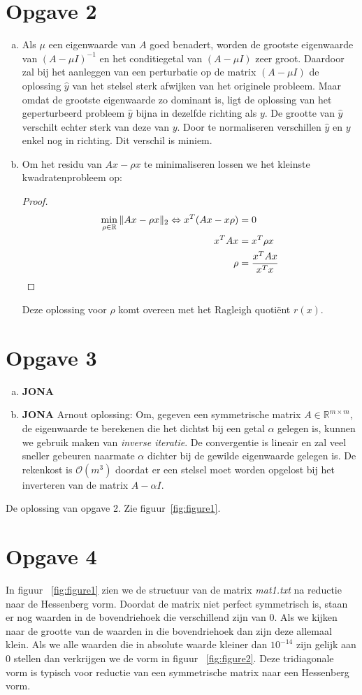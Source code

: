 \documentclass[a4paper]{article}
\newcommand{\opgave}[1]{\section*{Opgave #1}}
\begin{document}
\opgave{2}
\begin{enumerate}[a)] %
\item Als $\mu$ een eigenwaarde van $A$ goed benadert, worden de grootste eigenwaarde van $(A-\mu I)^{-1}$ en het conditiegetal van $(A-\mu I)$ zeer groot. Daardoor zal bij het aanleggen van een perturbatie op de matrix $(A-\mu I)$ de oplossing $\hat{y}$ van het stelsel sterk afwijken van het originele probleem. Maar omdat de grootste eigenwaarde zo dominant is, ligt de oplossing van het geperturbeerd probleem $\hat{y}$ bijna in dezelfde richting als $y$. De grootte van $\hat{y}$ verschilt echter sterk van deze van $y$. Door te normaliseren verschillen $\hat{y}$ en $y$ enkel nog in richting. Dit verschil is miniem.
\item Om het residu van $Ax-\rho x$ te minimaliseren lossen we het kleinste kwadratenprobleem op:
\begin{proof}
\begin{align}
\displaystyle\min_{\rho\in\mathbb{R}}\Arrowvert Ax-\rho x \Arrowvert _2 \Leftrightarrow x^{T}(Ax-x\rho) &= 0\label{eq1}\\
 x^TAx &= x^T\rho x \label{eq2}\\
 \rho&=\frac{x^TAx}{x^Tx} \label{eq:const1}
\end{align}
\end{proof}
Deze oplossing voor $\rho$ komt overeen met het Ragleigh quoti\"{e}nt $r(x)$.
\end{enumerate}



\opgave{3}
\begin{enumerate}[a)] %
\item \textbf{JONA}
\item \textbf{JONA} Arnout oplossing: Om, gegeven een symmetrische matrix $A \in \mathbb{R}^{m\times m}$, de eigenwaarde te berekenen die het dichtst bij een getal $\alpha$ gelegen is, kunnen we gebruik maken van \textit{inverse iteratie}. De convergentie is lineair en zal veel sneller gebeuren naarmate $\alpha$ dichter bij de gewilde eigenwaarde gelegen is. De rekenkost is $\mathcal{O} (m^3)$ doordat er een stelsel moet worden opgelost bij het inverteren van de matrix $A-\alpha I$.
\end{enumerate}
De oplossing van opgave 2. Zie figuur~\ref{fig:figure1}.
\opgave{4}
In figuur ~\ref{fig:figure1} zien we de structuur van de matrix \textit{mat1.txt} na reductie naar de Hessenberg vorm. Doordat de matrix niet perfect symmetrisch is, staan er nog waarden in de bovendriehoek die verschillend zijn van 0. Als we kijken naar de grootte van de waarden in die bovendriehoek dan zijn deze allemaal klein. Als we alle waarden die in absolute waarde kleiner dan $10^{-14}$ zijn gelijk aan 0 stellen dan verkrijgen we de vorm in figuur ~\ref{fig:figure2}. Deze tridiagonale vorm is typisch voor reductie van een symmetrische matrix naar een Hessenberg vorm.
\end{document}
